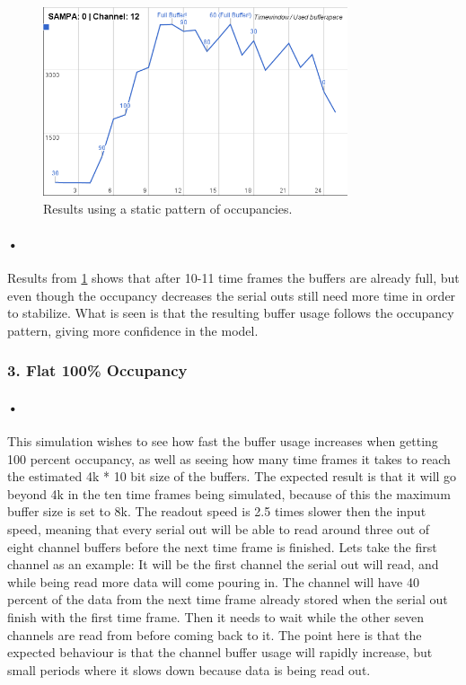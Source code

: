 \documentclass[a4paper, 12pt]{report}
\begin{document}
\begin{figure}[h!]
	\centering
		\includegraphics[width=0.8\textwidth]{images/results-alternating.png}
		\caption{Results using a static pattern of occupancies.}
		\label{fig:results-alternating}
\end{figure}

\paragraph{•} %
Results from \ref{fig:results-alternating} shows that after 10-11 time frames the buffers are already full, but even though the occupancy decreases the serial outs still need more time in order to stabilize.
What is seen is that the resulting buffer usage follows the occupancy pattern, giving more confidence in the model.

\subsubsection{3. Flat 100\% Occupancy}

\paragraph{•} %
This simulation wishes to see how fast the buffer usage increases when getting 100 percent occupancy, as well as seeing how many time frames it takes to reach the estimated 4k * 10 bit size of the buffers.
The expected result is that it will go beyond 4k in the ten time frames being simulated, because of this the maximum buffer size is set to 8k.
The readout speed is 2.5 times slower then the input speed, meaning that every serial out will be able to read around three out of eight channel buffers before the next time frame is finished.
Lets take the first channel as an example: It will be the first channel the serial out will read, and while being read more data will come pouring in.
The channel will have 40 percent of the data from the next time frame already stored when the serial out finish with the first time frame.
Then it needs to wait while the other seven channels are read from before coming back to it.
The point here is that the expected behaviour is that the channel buffer usage will rapidly increase, but small periods where it slows down because data is being read out.
\end{document}
